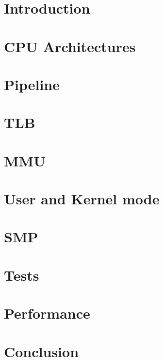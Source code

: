 \documentclass[11pt, twocolumn]{article}
\begin{document}
\clearpage
{}
\setcounter{page}{1}

\noindent


\section{Introduction}




\section{CPU Architectures}



\section{Pipeline}
%


\section{TLB}

\section{MMU}

\section{User and Kernel mode}

\section{SMP}

\section{Tests}

\section{Performance}

\section{Conclusion}


\newpage

{}


\newpage

\appendix
\begin{appendices}
\end{appendices}
\end{document}
